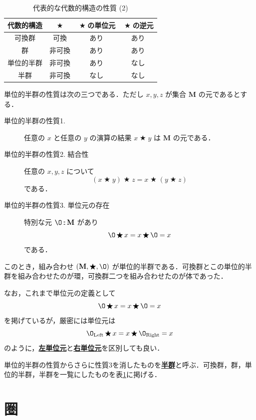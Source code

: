 \documentclass[a4paper,twocolumn]{jsbook}
\newcommand{\keyword}[1]{{\underline{\textbf{#1}}}}
\newcommand{\mZero}{\O}
\DeclareMathOperator{\mBinOp}{\bigstar}
\DeclareMathOperator{\mIn}{{:\!:}}
\newcommand{\mSpecialSub}[1]{\text{#1}}
\newcommand{\mLeft}{\mSpecialSub{Left}}
\newcommand{\mRight}{\mSpecialSub{Right}}
\newcommand{\mSet}[1]{\mathbf{#1}}
\newcommand{\mTupleWith}[1]{\left(#1\right)}
\begin{document}
\begin{table}
\caption{代表的な代数的構造の性質 (2)}
\label{tab:group-and-monoid}
\begin{center}
\begin{tabular}{||c||c|c|c||}
\hline
代数的構造&$\mBinOp$&$\mBinOp$の単位元&$\mBinOp$の逆元\\
\hline\hline
可換群&可換&あり&あり\\
群&非可換&あり&あり\\
単位的半群&非可換&あり&なし\\
半群&非可換&なし&なし\\
\hline
\end{tabular}
\end{center}
\end{table}

単位的半群の性質は次の三つである．ただし $x,y,z$ が集合 $\mSet{M}$ の元であるとする．
\begin{description}
\item[単位的半群の性質1.] 任意の $x$ と任意の $y$ の演算の結果 $x\mBinOp y$ は $\mSet{M}$ の元である．
\item[単位的半群の性質2. 結合性] 任意の $x,y,z$ について
\begin{equation}
(x\mBinOp y)\mBinOp z=x\mBinOp(y\mBinOp z)
\end{equation}
である．
\item[単位的半群の性質3. 単位元の存在] 特別な元 $\mZero\mIn\mSet{M}$ があり
\begin{equation}
\mZero\mBinOp x=x\mBinOp\mZero=x
\end{equation}
である．
\end{description}
このとき，組み合わせ $\mTupleWith{\mSet{M},\mBinOp,\mZero}$ が単位的半群である．可換群とこの単位的半群を組み合わせたのが環，可換群二つを組み合わせたのが体であった．

なお，これまで単位元の定義として
\begin{equation}
\mZero\mBinOp x=x\mBinOp\mZero=x
\end{equation}
を掲げているが，厳密には単位元は
\begin{equation}
\mZero_\mLeft\mBinOp x=x\mBinOp\mZero_\mRight=x
\end{equation}
のように，\keyword{左単位元}と\keyword{右単位元}を区別しても良い．

単位的半群の性質からさらに性質3を消したものを\keyword{半群}と呼ぶ．可換群，群，単位的半群，半群を一覧にしたものを表\ref{tab:group-and-monoid}に掲げる．

\section{圏}
\end{document}
